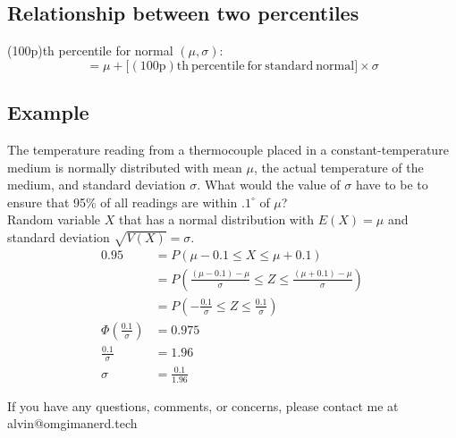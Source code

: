 \documentclass[letterpaper, 12pt]{math}
\begin{document}
\subsection*{Relationship between two percentiles}
(100p)th percentile for normal \( (\mu,\sigma) \):
\[ = \mu +\big[\mathrm{(100p)th\ percentile\ for\ standard\ normal}\big]
   \times\sigma \]

\subsection*{Example}
The temperature reading from a thermocouple placed in a constant-temperature
medium is normally distributed with mean \( \mu \), the actual temperature
of the medium, and standard deviation \( \sigma \). What would the value of
\( \sigma \) have to be to ensure that 95\% of all readings are within
\( .1^{\circ} \) of \( \mu \)? \\
Random variable \( X \) that has a normal distribution with \( E(X) = \mu \)
and standard deviation \( \sqrt{V(X)} = \sigma \).
\begin{align*}
  0.95 &= P(\mu-0.1\leq X\leq\mu+0.1) \\
  &= P(\frac{(\mu-0.1)-\mu}{\sigma}\leq Z\leq\frac{(\mu+0.1)-\mu}{\sigma}) \\
  &= P(-\frac{0.1}{\sigma}\leq Z\leq\frac{0.1}{\sigma}) \\
  \Phi(\frac{0.1}{\sigma}) &= 0.975 \\
  \frac{0.1}{\sigma} &= 1.96 \\
  \sigma &= \frac{0.1}{1.96}
\end{align*}

\begin{center}
  If you have any questions, comments, or concerns, please contact me at
  alvin@omgimanerd.tech
\end{center}
\end{document}
